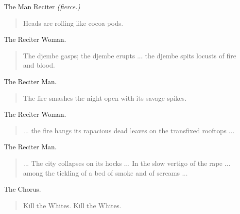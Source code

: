 \documentclass[letterpaper,article,12pt,oneside,notitlepage]{memoir}
\begin{document}
\begin{center}The Man Reciter \textit{(fierce.)}\end{center}

\begin{verse}
\hspace{1cm} Heads are rolling like cocoa pods. \\
\end{verse}

\begin{center}The Reciter Woman.\end{center}

\begin{verse}
\indent The djembe gasps; the djembe erupts ... the djembe spits locusts of fire and blood. \\
\end{verse}

\begin{center}The Reciter Man.\end{center}

\begin{verse}
\hspace{1cm} The fire smashes the night open with its savage spikes. \\
\end{verse}

\begin{center}The Reciter Woman.\end{center}

\begin{verse}
\indent ... the fire hangs its rapacious dead leaves on the transfixed rooftops ... \\
\end{verse}

\clearpage

\begin{center}The Reciter Man.\end{center}

\begin{verse}
\indent ... The city collapses on its hocks ... In the slow vertigo of the rape ... among the tickling of a bed of smoke and of screams ... \\
\end{verse}

\begin{center}The Chorus.\end{center}

\begin{verse}
\hspace{1cm} Kill the Whites. Kill the Whites. \\
\end{verse}
\end{document}
